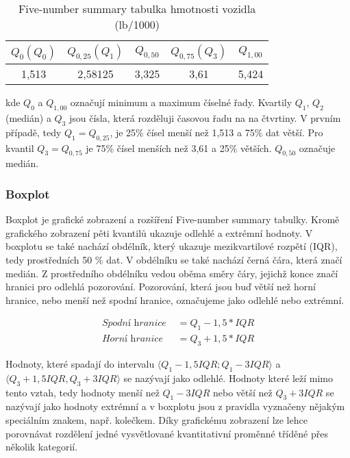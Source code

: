 \begin{table}[H]

    \centering
    \begin{tabular}[t]{c|c|c|c|c}
        \hline
        $Q_{0} (Q_0)$ & $Q_{0,25} (Q_1) $ & $Q_{0,50}$ & $Q_{0,75} (Q_3)$ & $Q_{1,00}$\\
        \hline
        1,513 & 2,58125 & 3,325 & 3,61 & 5,424\\
        \hline
    \end{tabular}
    \caption{\label{tab:five-number_summary}Five-number summary tabulka hmotnosti vozidla (lb/1000)}
\end{table}

kde $Q_{0}$ a $Q_{1,00}$ označují minimum a maximum číselné řady. Kvartily $Q_{1}$, $Q_{2}$ (medián) a $Q_{3}$ jsou čísla, která rozděluji časovou řadu na na čtvrtiny. V prvním
případě, tedy $Q_1 = Q_{0,25}$, je 25\% čísel menší než 1,513 a 75\% dat větší. Pro kvantil $Q_3 = Q_{0,75}$ je 75\% čísel menších než 3,61 a 25\% větších. $Q_{0,50}$ označuje medián.

\subsubsection{Boxplot}
Boxplot je grafické zobrazení a rozšíření Five-number summary tabulky. Kromě grafického zobrazení 
pěti kvantilů  ukazuje odlehlé a extrémní hodnoty.
V boxplotu se také nachází obdélník, který ukazuje mezikvartilové rozpětí (IQR), tedy prostředních 50 \% dat. V obdélníku se také nachází černá čára, která značí medián.
Z prostředního obdélníku vedou oběma směry čáry, jejichž konce značí hranici pro odlehlá pozorování.
{\color{red}
Pozorování, která jsou buď větší než horní hranice, nebo menší než spodní hranice, označujeme jako odlehlé nebo extrémní. 
}

\begin{align}
    \textit{Spodní hranice } &= Q_1 - 1,5 * IQR \\
    \textit{Horní hranice } &= Q_3 + 1,5 * IQR
\end{align}

Hodnoty, které spadají do intervalu $\langle Q_1 - 1,5IQR; Q_1 - 3IQR\rangle$ a $\langle Q_3 + 1,5IQR, Q_3 + 3IQR \rangle$ se nazývají jako odlehlé.
Hodnoty které leží mimo tento vztah, tedy hodnoty menší než $Q_1 - 3IQR$ nebo větší než $Q_3 + 3IQR$ se nazývají jako hodnoty extrémní a
v boxplotu jsou z pravidla vyznačeny nějakým speciálním znakem, např. kolečkem.
Díky grafickému zobrazení lze lehce porovnávat rozdělení jedné vysvětlované kvantitativní proměnné tříděné přes několik kategorií.


